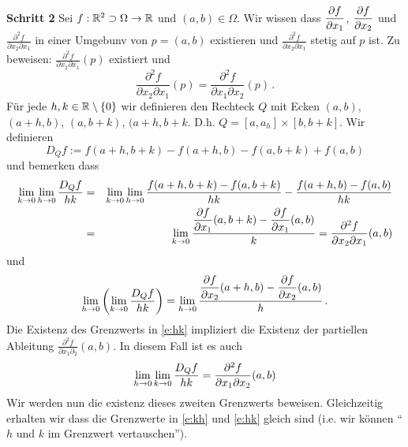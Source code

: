 \begin{Bew}
{\bf Schritt 2}
Sei  $f:\mathbb{R}^2 \supset\Omega\rightarrow\mathbb{R}$ und $(a,b)\in \Omega$.
Wir wissen dass  $\dfrac{\partial f}{\partial x_1}$, $\dfrac{\partial f}{\partial x_2}$ und $\frac{\partial^2 f}{\partial x_2\partial x_1}$ in einer Umgebunv von $p=(a,b)$ existieren  und $\frac{\partial^2 f}{\partial x_2\partial x_1}$ stetig auf $p$ ist. Zu beweisen: $\frac{\partial^2 f}{\partial x_2\partial x_1}(p)$ existiert und
  \[\frac{\partial^2 f}{\partial x_2\partial x_1}(p)=\frac{\partial^2 f}{\partial x_1\partial x_2}(p)\, .\]
 F\"ur jede $h,k\in\mathbb{R}\setminus\left\{ 0 \right\}$ wir definieren den Rechteck $Q$ mit
Ecken $(a,b)$, $(a+h, b)$, $(a, b+k)$, $(a+h, b+k$. D.h. $Q= [a, a_h]\times [b, b+k]$. Wir definieren 
  \[D_Qf:=f(a+h,b+k)-f(a+h, b)-f(a,b+k)+f(a,b)\] und bemerken dass
  \begin{eqnarray}
\displaystyle\lim_{k\rightarrow0} \displaystyle\lim_{h\rightarrow0}\frac{D_Qf}{hk}
&=&\displaystyle\lim_{k\rightarrow0} \displaystyle\lim_{h\rightarrow0}\frac{f(a+h,b+k)-f(a,b+k)}{hk}-\frac{f(a+h,b)-f(a,b)}{hk}\nonumber\\
 &=&\displaystyle\lim_{k\rightarrow0}\frac{\dfrac{\partial f}{\partial x_1}(a,b+k)-\dfrac{\partial f}{\partial x_1}(a,b)}{k}=\frac{\partial^2f}{\partial x_2\partial x_1}(a,b)
\label{e:kh}
\end{eqnarray}
und
\begin{equation}\label{e:hk}  
\displaystyle\lim_{h\rightarrow0}\left( \displaystyle\lim_{k\rightarrow0}\frac{D_Qf}{hk} \right)
=\displaystyle\lim_{h\rightarrow0}\frac{\dfrac{\partial f}{\partial x_2}(a+h,b)-\dfrac{\partial f}{\partial x_2}(a,b)}{h}\, .
\end{equation}
Die Existenz des Grenzwerts in \eqref{e:hk} impliziert die Existenz der partiellen Ableitung
$\frac{\partial^2 f}{\partial x_1\partial _2} (a,b)$. In diesem Fall ist es auch
 \[\displaystyle\lim_{h\rightarrow0}\displaystyle\lim_{k\rightarrow0}\frac{D_Qf}{hk} =\frac{\partial^2f}{\partial x_1\partial x_2}(a,b)\]
Wir werden nun die existenz dieses zweiten Grenzwerts beweisen. Gleichzeitig erhalten wir dass die
Grenzwerte in \eqref{e:kh} und \eqref{e:hk} gleich sind (i.e. wir k\"onnen ``$h$ und $k$ 
im Grenzwert vertauschen''). 
 

\end{Bew}
